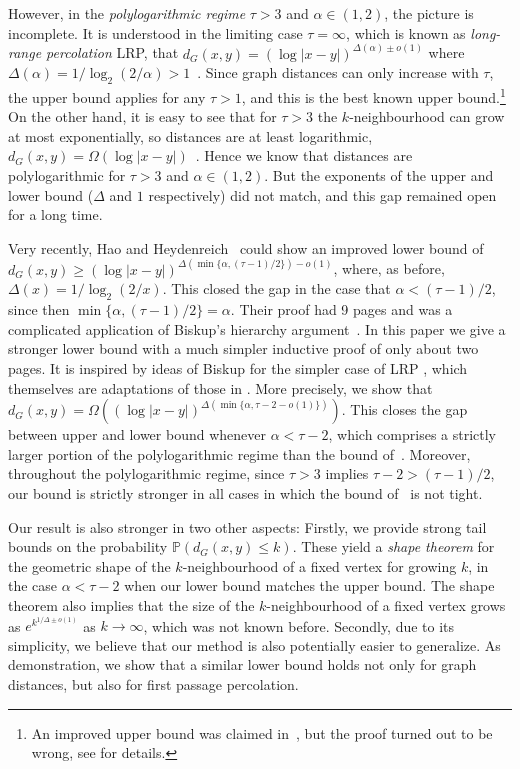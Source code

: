 \documentclass[11pt, letterpaper, margin=1in]{amsart}
\theoremstyle{definition}
\theoremstyle{remark}
\renewcommand{\Pr}[1]{\ensuremath{\mathbb{P} \left(#1 \right) }}
\numberwithin{equation}{section}
\begin{document}
However, in the \emph{polylogarithmic regime} $\tau >3$ and $\alpha\in (1,2)$, the picture is incomplete. It is understood in the limiting case $\tau =\infty$, which is known as \emph{long-range percolation} LRP, that $d_G(x,y) = (\log|x-y|)^{\Delta(\alpha) \pm o(1)}$ where $\Delta(\alpha) = 1/\log_2(2/\alpha) > 1$~\cite{Biskup_2004,Berger_2004}. Since graph distances can only increase with $\tau$, the upper bound applies for any $\tau >1$, and this is the best known upper bound.\footnote{An improved upper bound was claimed in~\cite{hao2023graph}, but the proof turned out to be wrong, see  for details.} On the other hand, it is easy to see that for $\tau > 3$ the $k$-neighbourhood can grow at most exponentially, so distances are at least logarithmic, $d_G(x,y) = \Omega(\log|x-y|)$~\cite{deijfen2013scale}. Hence we know that distances are polylogarithmic for $\tau >3$ and $\alpha\in(1,2)$. But the exponents of the upper and lower bound ($\Delta$ and $1$ respectively) did not match, and this gap remained open for a long time. 

Very recently, Hao and Heydenreich~\cite{hao2023graph} could show an improved lower bound of $d_G(x,y) \ge (\log|x-y|)^{\Delta(\min\{\alpha,(\tau-1)/2\}) - o(1)}$, where, as before, $\Delta(x) = 1/\log_2(2/x)$. This closed the gap in the case that $\alpha < (\tau-1)/2$, since then $\min\{\alpha,(\tau-1)/2\} = \alpha$. Their proof had 9 pages and was a complicated application of Biskup's hierarchy argument~\cite{Biskup_2004}. In this paper we give a stronger lower bound with a much simpler inductive proof of only about two pages. It is inspired by ideas of Biskup for the simpler case of LRP \cite{Biskup_2011}, which themselves are adaptations of those in \cite{Trapman_2010}.  More precisely, we show that $d_G(x,y) = \Omega \left((\log|x-y|)^{\Delta(\min\{\alpha,\tau-2 - o(1)\})}\right)$. This closes the gap between upper and lower bound whenever $\alpha < \tau-2$, which comprises a strictly larger portion of the polylogarithmic regime than the bound of~\cite{hao2023graph}. Moreover, throughout the polylogarithmic regime, since $\tau >3$ implies $\tau-2 > (\tau-1)/2$, our bound is strictly stronger in all cases in which the bound of~\cite{hao2023graph} is not tight. 

Our result is also stronger in two other aspects: Firstly, we provide strong tail bounds on the probability $\Pr{d_G(x,y)\le k}$.
These yield a \emph{shape theorem} for the geometric shape of the $k$-neighbourhood of a fixed vertex for growing $k$, in the case $\alpha <\tau-2$ when our lower bound matches the upper bound. The shape theorem also implies that the size of the $k$-neighbourhood of a fixed vertex grows as $e^{k^{1/\Delta \pm o(1)}}$ as $k\to\infty$, which was not known before. Secondly, due to its simplicity, we believe that our method is also potentially easier to generalize. As demonstration, we show that a similar lower bound holds not only for graph distances, but also for first passage percolation. 
\end{document}
